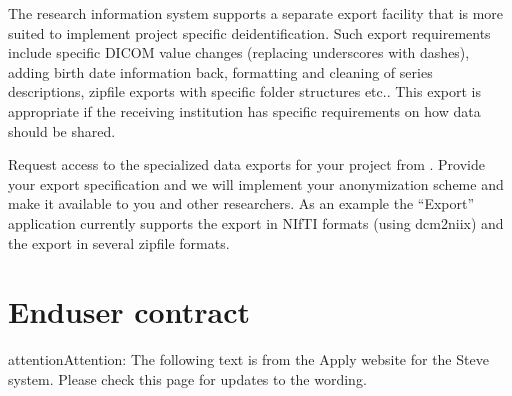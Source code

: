 \documentclass[letterpaper,10pt,english]{sphinxmanual}
\begin{document}
\sphinxAtStartPar
{}

\sphinxAtStartPar
The research information system supports a separate export facility that is more suited to implement project specific de\sphinxhyphen{}identification. Such export requirements include specific DICOM value changes (replacing underscores with dashes), adding birth date information back, formatting and cleaning of series descriptions, zip\sphinxhyphen{}file exports with specific folder structures etc.. This export is appropriate if the receiving institution has specific requirements on how data should be shared.

\sphinxAtStartPar
Request access to the specialized data exports for your project from . Provide your export specification and we will implement your anonymization scheme and make it available to you and other researchers. As an example the “Export” application currently supports the export in NIfTI formats (using dcm2niix) and the export in several zip\sphinxhyphen{}file formats.


\section{End\sphinxhyphen{}user contract}
\label{\detokenize{EndUser/index:end-user-contract}}
\begin{sphinxadmonition}{attention}{Attention:}
\sphinxAtStartPar
The following text is from the Apply website for the Steve system. Please check this page for updates to the wording.
\end{sphinxadmonition}
\end{document}
